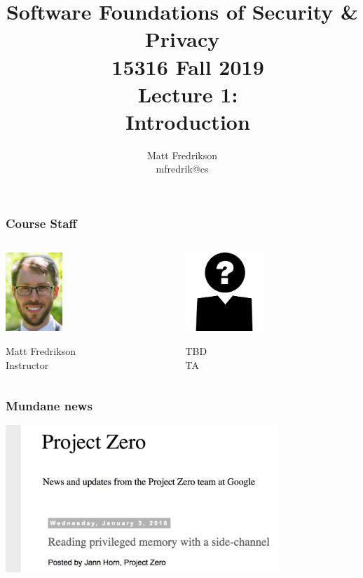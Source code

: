 \documentclass[10pt,handout]{beamer}
\title[Software Foundations of S \& P]{
\RaggedRight
	Software Foundations of Security \& Privacy \\
	\ 15316 Fall 2019 \\
	\ Lecture 1: \\
	\ Introduction
}
\author[Matt Fredrikson]{
	Matt Fredrikson \\
	mfredrik@cs
}
\begin{document}
\setlength\abovedisplayskip{5pt}
\setlength\belowdisplayskip{5pt}


\begin{frame}
\titlepage
\end{frame}


\begin{frame}

\frametitle{Course Staff}

\begin{columns}

\begin{column}{0.5\textwidth}
\centering
\includegraphics[height=8em]{matt.jpg}

Matt Fredrikson \\
Instructor
\end{column}

\begin{column}{0.5\textwidth}
\centering
\includegraphics[height=8em]{avatar.jpg}

TBD \\
TA
\end{column}

\end{columns}

\end{frame}


\begin{frame}

\frametitle{Mundane news}

\centering
\includegraphics[height=15em]{sidechan-blog.png}

\end{frame}
\end{document}
